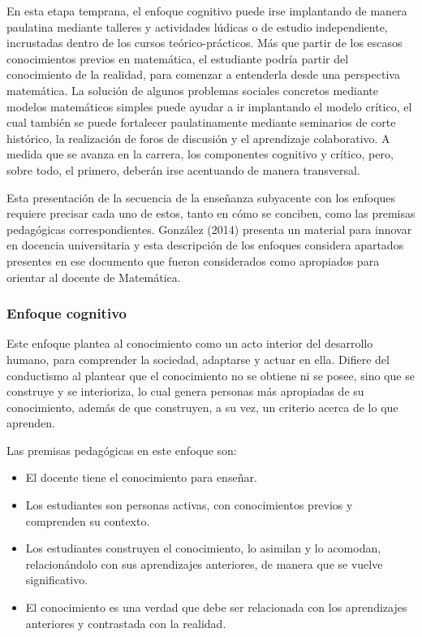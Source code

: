 En esta etapa temprana, el enfoque cognitivo puede irse implantando de manera paulatina mediante talleres y actividades lúdicas o de estudio independiente, incrustadas dentro de los cursos teórico-prácticos. Más que partir de los escasos conocimientos previos en matemática, el estudiante podría partir del conocimiento de la realidad, para comenzar a entenderla desde una perspectiva matemática. La solución de algunos problemas sociales concretos mediante modelos matemáticos simples puede ayudar a ir implantando el modelo crítico, el cual también se puede fortalecer paulatinamente mediante seminarios de corte histórico, la realización de foros de discusión y el aprendizaje colaborativo. A medida que se avanza en la carrera, los componentes cognitivo y crítico, pero, sobre todo, el primero, deberán irse acentuando de manera transversal. 

Esta presentación de la secuencia de la enseñanza subyacente con los enfoques requiere precisar cada uno de estos, tanto en cómo se conciben, como las premisas pedagógicas correspondientes. González (2014) presenta un material para innovar en docencia universitaria y esta descripción de los enfoques considera apartados presentes en ese documento que fueron considerados como apropiados para orientar al docente de Matemática. 

\subsubsection*{Enfoque cognitivo}

Este enfoque plantea al conocimiento como un acto interior del desarrollo humano, para comprender la sociedad, adaptarse y actuar en ella.  Difiere del conductismo al plantear que el conocimiento no se obtiene ni se posee, sino que se construye y se interioriza, lo cual genera personas más apropiadas de su conocimiento, además de que construyen, a su vez, un criterio acerca de lo que aprenden. 

Las premisas pedagógicas en este enfoque son: 


\begin{itemize}
    
    \color{blue} \item \color{black} El docente tiene el conocimiento para enseñar.  

    
     \color{blue} \item \color{black} Los estudiantes son personas activas, con conocimientos previos y comprenden su contexto. 
     
    \color{blue} \item \color{black}  Los estudiantes construyen el conocimiento, lo asimilan y lo acomodan, relacionándolo con sus aprendizajes anteriores, de manera que se vuelve significativo. 
    
     \color{blue} \item \color{black} El conocimiento es una verdad que debe ser relacionada con los aprendizajes anteriores y contrastada con la realidad. 
     
     \end{itemize}
     
